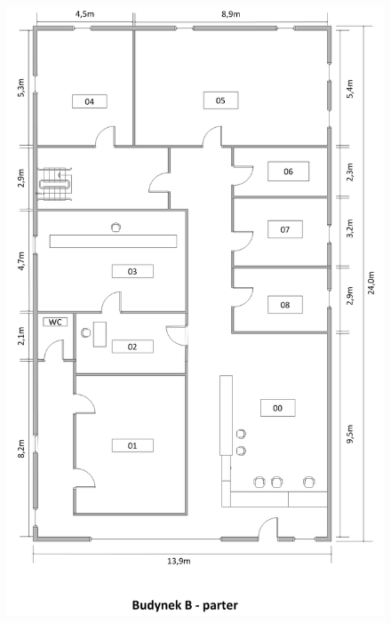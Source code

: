 \documentclass{report}
\begin{document}
\begin{figure}[H]
  \centering
      \includegraphics[width=\textwidth]{./obrazki/plany_wew/b0.png}
\end{figure}
\end{document}

